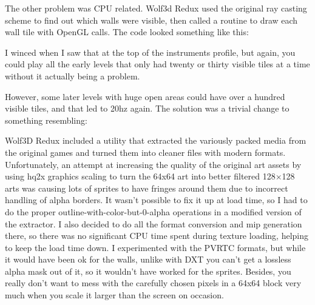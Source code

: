 The other problem was CPU related.  Wolf3d Redux used the original ray casting scheme to find out which walls were visible, then called a routine to draw each wall tile with OpenGL calls.  The code looked something like this:\\
\par
\begin{minipage}{\textwidth}

\end{minipage}
\par

I winced when I saw that at the top of the instruments profile, but again, you could play all the early levels that only had twenty or thirty visible tiles at a time without it actually being a problem. \\
\par

However, some later levels with huge open areas could have over a hundred visible tiles, and that led to 20hz again.  The solution was a trivial change to something resembling:\\
\par

\begin{minipage}{\textwidth}

\end{minipage}
\par

Wolf3D Redux included a utility that extracted the variously packed media from the original games and turned them into cleaner files with modern formats.  Unfortunately, an attempt at increasing the quality of the original art assets by using hq2x graphics scaling to turn the 64x64 art into better filtered 128×128 arts was causing lots of sprites to have fringes around them due to incorrect handling of alpha borders.  It wasn't possible to fix it up at load time, so I had to do the proper outline-with-color-but-0-alpha operations in a modified version of the extractor.  I also decided to do all the format conversion and mip generation there, so there was no significant CPU time spent during texture loading, helping to keep the load time down.  I experimented with the PVRTC formats, but while it would have been ok for the walls, unlike with DXT you can't get a lossless alpha mask out of it, so it wouldn't have worked for the sprites.  Besides, you really don't want to mess with the carefully chosen pixels in a 64x64 block very much when you scale it larger than the screen on occasion.\\
\par

